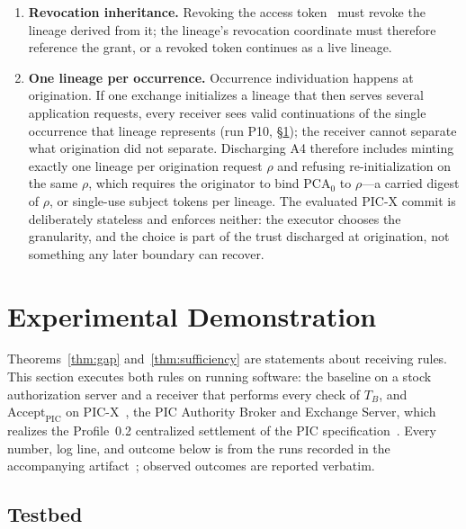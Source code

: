 \documentclass[conference]{IEEEtran}
\newcommand{\Accept}{\mathrm{Accept}}
\begin{document}
\begin{enumerate}
\item \textbf{Revocation inheritance.} Revoking the access token~\cite{rfc7009} must revoke the lineage derived from it; the lineage's revocation coordinate must therefore reference the grant, or a revoked token continues as a live lineage.
\item \textbf{One lineage per occurrence.} Occurrence individuation happens at origination. If one exchange initializes a lineage that then serves several application requests, every receiver sees valid continuations of the single occurrence that lineage represents (run P10, \S\ref{sec:impl}); the receiver cannot separate what origination did not separate. Discharging A4 therefore includes minting exactly one lineage per origination request $\rho$ and refusing re-initialization on the same $\rho$, which requires the originator to bind $\mathrm{PCA}_0$ to $\rho$---a carried digest of $\rho$, or single-use subject tokens per lineage. The evaluated PIC-X commit is deliberately stateless and enforces neither: the executor chooses the granularity, and the choice is part of the trust discharged at origination, not something any later boundary can recover.
\end{enumerate}

\section{Experimental Demonstration}\label{sec:impl}

Theorems~\ref{thm:gap} and~\ref{thm:sufficiency} are statements about receiving rules. This section executes both rules on running software: the baseline on a stock authorization server and a receiver that performs every check of $T_B$, and $\Accept_{\mathrm{PIC}}$ on PIC-X~\cite{picx}, the PIC Authority Broker and Exchange Server, which realizes the Profile~0.2 centralized settlement of the PIC specification~\cite{picspec}. Every number, log line, and outcome below is from the runs recorded in the accompanying artifact~\cite{picartifact}; observed outcomes are reported verbatim.

\subsection{Testbed}\label{sec:testbed}
\end{document}
